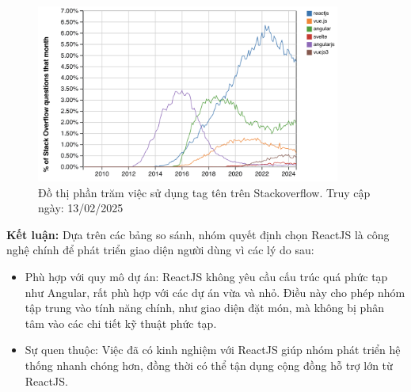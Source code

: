 \begin{enumerate}[(a)]
	      \begin{figure}[H]
		      \centering
		      \includegraphics[width=10cm]{Images/react-stack-overflow.png}
		      \vspace{0.5cm}
		      \caption{Đồ thị phần trăm việc sử dụng tag tên trên Stackoverflow. Truy cập ngày: 13/02/2025}
		      \label{fig:my_label}
	      \end{figure}

	      \textbf{Kết luận: } Dựa trên các bảng so sánh, nhóm quyết định chọn ReactJS là công nghệ chính để phát triển giao diện người dùng vì các lý do sau:

	      \begin{itemize}
		      \item Phù hợp với quy mô dự án: ReactJS không yêu cầu cấu trúc quá phức tạp như Angular, rất phù hợp với các dự án vừa và nhỏ. Điều này cho phép nhóm tập trung vào tính năng chính, như giao diện đặt món, mà không bị phân tâm vào các chi tiết kỹ thuật phức tạp.
		      \item Sự quen thuộc: Việc đã có kinh nghiệm với ReactJS giúp nhóm phát triển hệ thống nhanh chóng hơn, đồng thời có thể tận dụng cộng đồng hỗ trợ lớn từ ReactJS.
	      \end{itemize}



\end{enumerate}
